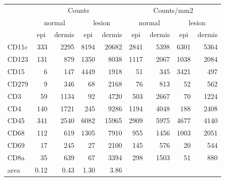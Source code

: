 \documentclass{article}
\begin{document}
\begin{tabular}{lrrrr|rrrr}
   \hline
 
         \multicolumn{1}{c}{} & \multicolumn{4}{c|}{Counts} & \multicolumn{4}{c}{Counts/mm2} \\ 
         \multicolumn{1}{c}{} & \multicolumn{2}{c}{normal} & \multicolumn{2}{c|}{lesion} & \multicolumn{2}{c}{normal} & \multicolumn{2}{c}{lesion}  \\ 
         \multicolumn{1}{c}{} & \multicolumn{1}{c}{epi} & dermis & \multicolumn{1}{c}{epi} & \multicolumn{1}{c|}{dermis} & \multicolumn{1}{c}{epi} & dermis & \multicolumn{1}{c}{epi} & dermis  \\ 
         \hline
    CD11c & 333 & 2295 & 8194 & 20682 & 2841 & 5398 & 6301 & 5364 \\ 
  CD123 & 131 & 879 & 1350 & 8038 & 1117 & 2067 & 1038 & 2084 \\ 
  CD15 & 6 & 147 & 4449 & 1918 & 51 & 345 & 3421 & 497 \\ 
  CD279 & 9 & 346 & 68 & 2168 & 76 & 813 & 52 & 562 \\ 
  CD3 & 59 & 1134 & 92 & 4720 & 503 & 2667 & 70 & 1224 \\ 
  CD4 & 140 & 1721 & 245 & 9286 & 1194 & 4048 & 188 & 2408 \\ 
  CD45 & 341 & 2540 & 6082 & 15965 & 2909 & 5975 & 4677 & 4140 \\ 
  CD68 & 112 & 619 & 1305 & 7910 & 955 & 1456 & 1003 & 2051 \\ 
  CD69 & 17 & 245 & 27 & 2100 & 145 & 576 & 20 & 544 \\ 
  CD8a & 35 & 639 & 67 & 3394 & 298 & 1503 & 51 & 880 \\ 
  area & 0.12 & 0.43 & 1.30 & 3.86 &    &    &    &    \\ 
   \hline
\end{tabular}
\end{document}
